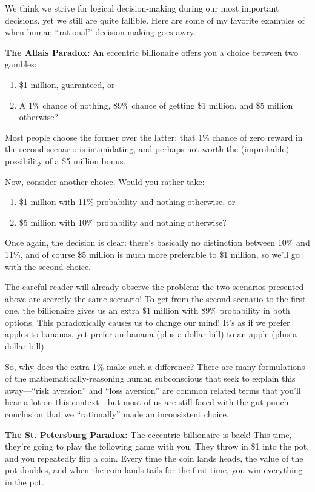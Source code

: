 \documentclass{article}
\begin{document}
\begin{multicols}{3}
We think we strive for logical decision-making during our most important decisions, yet we still are quite fallible. Here are some of my favorite examples of when human ``rational’’ decision-making goes awry.

\textbf{The Allais Paradox:} An eccentric billionaire offers you a choice between two gambles:
\begin{enumerate}
\item \$1 million, guaranteed, or
\item A 1\% chance of nothing, 89\% chance of getting \$1 million, and \$5 million otherwise?
\end{enumerate}
Most people choose the former over the latter: that 1\% chance of zero reward in the second scenario is intimidating, and perhaps not worth the (improbable) possibility of a \$5 million bonus.

Now, consider another choice. Would you rather take:
\begin{enumerate}
\item \$1 million with 11\% probability and nothing otherwise, or
\item \$5 million with 10\% probability and nothing otherwise?
\end{enumerate}
Once again, the decision is clear: there’s basically no distinction between 10\% and 11\%, and of course \$5 million is much more preferable to \$1 million, so we’ll go with the second choice.

The careful reader will already observe the problem: the two scenarios presented above are secretly the same scenario!
To get from the second scenario to the first one, the billionaire gives us an extra \$1 million with 89\% probability in both options. This paradoxically causes us to change our mind! It's as if we prefer apples to bananas, yet prefer an banana (plus a dollar bill) to an apple (plus a dollar bill).

So, why does the extra 1\% make such a difference? There are many formulations of the mathematically-reasoning human subconscious that seek to explain this away---``risk aversion'' and ``loss aversion'' are common related terms that you'll hear a lot on this context---but most of us are still faced with the gut-punch conclusion that we ``rationally'' made an inconsistent choice.

\textbf{The St. Petersburg Paradox:}
The eccentric billionaire is back! This time, they're going to play the following game with you. They throw in \$1 into the pot, and you repeatedly flip a coin. Every time the coin lands heads, the value of the pot doubles, and when the coin lands tails for the first time, you win everything in the pot.


\end{multicols}
\end{document}

